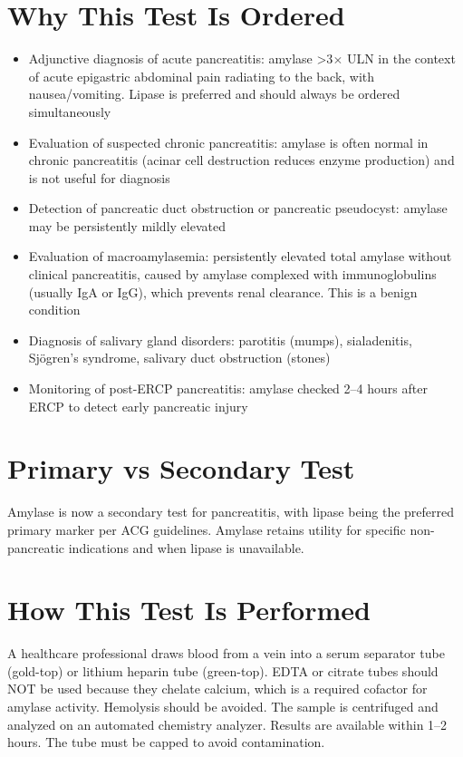 \section*{Why This Test Is Ordered}
\begin{itemize}
  \item Adjunctive diagnosis of acute pancreatitis: amylase >3$\times$ ULN in the context of acute epigastric abdominal pain radiating to the back, with nausea/vomiting. Lipase is preferred and should always be ordered simultaneously
  \item Evaluation of suspected chronic pancreatitis: amylase is often normal in chronic pancreatitis (acinar cell destruction reduces enzyme production) and is not useful for diagnosis
  \item Detection of pancreatic duct obstruction or pancreatic pseudocyst: amylase may be persistently mildly elevated
  \item Evaluation of macroamylasemia: persistently elevated total amylase without clinical pancreatitis, caused by amylase complexed with immunoglobulins (usually IgA or IgG), which prevents renal clearance. This is a benign condition
  \item Diagnosis of salivary gland disorders: parotitis (mumps), sialadenitis, Sj\"{o}gren's syndrome, salivary duct obstruction (stones)
  \item Monitoring of post-ERCP pancreatitis: amylase checked 2--4 hours after ERCP to detect early pancreatic injury
\end{itemize}

\section*{Primary vs Secondary Test}
Amylase is now a secondary test for pancreatitis, with lipase being the preferred primary marker per ACG guidelines. Amylase retains utility for specific non-pancreatic indications and when lipase is unavailable.

\section*{How This Test Is Performed}
A healthcare professional draws blood from a vein into a serum separator tube (gold-top) or lithium heparin tube (green-top). EDTA or citrate tubes should NOT be used because they chelate calcium, which is a required cofactor for amylase activity. Hemolysis should be avoided. The sample is centrifuged and analyzed on an automated chemistry analyzer. Results are available within 1--2 hours. The tube must be capped to avoid contamination.

